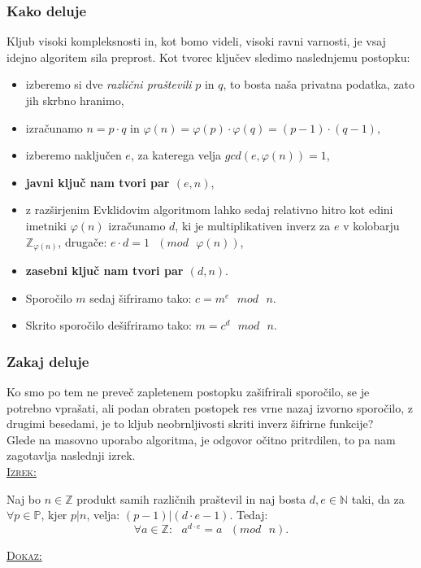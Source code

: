 \documentclass[a4paper, 12pt]{article} %
\newenvironment{matematika}[1]{
\textcolor{bostonuniversityred}{\underline{\textsc{#1:}}}
}{
}
\begin{document}
\subsubsection{Kako deluje}
Kljub visoki kompleksnosti in, kot bomo videli, visoki ravni varnosti, je vsaj idejno algoritem sila preprost. Kot tvorec ključev sledimo naslednjemu postopku:
\begin{itemize}[label=]
\item izberemo si dve \emph{različni praštevili} $p$ in $q$, to bosta naša privatna podatka, zato jih skrbno hranimo,
\item izračunamo $n=p \cdot q$ in $\varphi (n) = \varphi (p) \cdot \varphi (q) = (p-1) \cdot (q-1),$
\item izberemo naključen $e$, za katerega velja $gcd(e, \varphi (n)) = 1$,
\item \textbf{javni ključ nam tvori par $(e, n)$},
\item z razširjenim Evklidovim algoritmom lahko sedaj relativno hitro kot edini imetniki $\varphi (n)$ izračunamo $d$, ki je multiplikativen inverz za $e$ v kolobarju $\mathbb{Z}_{\varphi (n)}$, drugače: $e \cdot d = 1 \text{ } (mod \text{ } \varphi (n))$,
\item \textbf{zasebni ključ nam tvori par $(d, n)$}.
\item Sporočilo $m$ sedaj šifriramo tako: $c = m^e \text{ } mod \text{ } n$.
\item Skrito sporočilo dešifriramo tako: $m = c^d \text{ } mod \text{ } n$.
\end{itemize}

\subsubsection{Zakaj deluje}

Ko smo po tem ne preveč zapletenem postopku zašifrirali sporočilo, se je potrebno vprašati, ali podan obraten postopek res vrne nazaj izvorno sporočilo, z drugimi besedami, je to kljub neobrnljivosti skriti inverz šifrirne funkcije? \\
Glede na masovno uporabo algoritma, je odgovor očitno pritrdilen, to pa nam zagotavlja naslednji izrek. \\

\begin{matematika}{Izrek}
Naj bo $n \in \mathbb{Z}$ produkt samih različnih praštevil in naj bosta $d, e \in \mathbb{N}$ taki, da za $\forall p \in \mathbb{P}$, kjer $p|n$, velja: $(p-1)|(d \cdot e - 1)$. Tedaj:
\[
\forall a \in \mathbb{Z}: \text{ } a^{d \cdot e} = a \text{ } (mod \text{ } n).
\]
\end{matematika}

\begin{matematika}{Dokaz}

\end{matematika}
\end{document}
